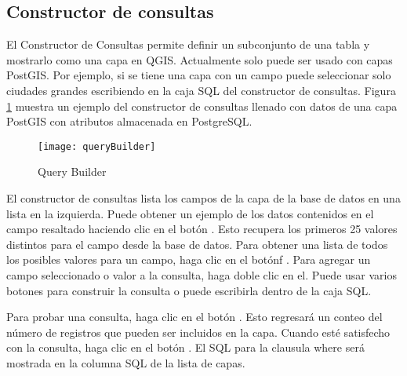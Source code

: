 \subsection{Constructor de consultas}\label{sec:query_builder}

El Constructor de Consultas permite definir un subconjunto de una tabla y mostrarlo como una capa en QGIS. Actualmente solo puede ser usado con capas PostGIS. 
Por ejemplo, si se tiene una capa  con un campo  puede seleccionar solo ciudades grandes escribiendo  en la caja SQL del constructor de consultas. Figura
\ref{fig:query_builder} muestra un ejemplo del constructor de consultas llenado con datos de una capa PostGIS con atributos almacenada en PostgreSQL. 

\begin{figure}[ht]
  \begin{center}
    \caption{Query Builder \nixcaption}\label{fig:query_builder}\smallskip
    \texttt{[image: queryBuilder]}
  \end{center}  
\end{figure}

El constructor de consultas  lista los campos de la capa de la base de datos en una lista en la izquierda. Puede obtener un ejemplo de los datos contenidos en el campo resaltado haciendo clic en el bot\'on  . Esto recupera los primeros 25 valores distintos para el campo desde la base de datos. Para obtener una lista de todos los posibles valores para un campo, haga clic en el bot\'onf  . Para agregar un campo seleccionado o valor a la consulta, haga doble clic en el. Puede usar varios botones para construir la consulta o puede escribirla dentro de la caja SQL.

Para probar una consulta, haga clic en el bot\'on  . Esto regresar\'a un conteo del n\'umero de registros que pueden ser incluidos en la capa. Cuando est\'e satisfecho con la consulta, haga clic en el bot\'on . El SQL para la clausula where ser\'a mostrada en la columna SQL de la lista de capas.

\begin{Tip}\caption{\textsc{Cambiando la Definici\'on de la Capa}}
\end{Tip}

